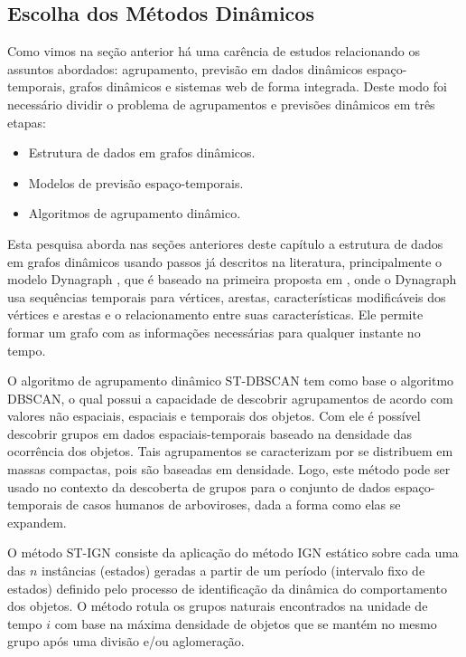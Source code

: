 \subsection{Escolha dos Métodos Dinâmicos}
\label{subsec:metodos-escolhidos}

Como vimos na seção anterior há uma carência de estudos relacionando os assuntos abordados: agrupamento, previsão em dados dinâmicos espaço-temporais, grafos dinâmicos e sistemas web de forma integrada. Deste modo foi necessário dividir o problema de agrupamentos e previsões dinâmicos em três etapas:
\begin{itemize}
\item Estrutura de dados em grafos dinâmicos.
\item Modelos de previsão espaço-temporais.
\item Algoritmos de agrupamento dinâmico.
\end{itemize}

Esta pesquisa aborda nas seções anteriores deste capítulo a estrutura de dados em grafos dinâmicos usando passos já descritos na literatura, principalmente o modelo Dynagraph \cite{dynagraph}, que é baseado na primeira proposta em \cite{dynagraph2012}, onde o Dynagraph usa sequências temporais para vértices, arestas, características modificáveis dos vértices e arestas e o relacionamento entre suas características. Ele permite formar um grafo com as informações necessárias para qualquer instante no tempo. 

O algoritmo de agrupamento dinâmico \acrshort{ST-DBSCAN} tem como base o algoritmo \acrshort{DBSCAN}, o qual possui a capacidade de descobrir agrupamentos de acordo com valores não espaciais, espaciais e temporais dos objetos. Com ele é possível descobrir grupos em dados espaciais-temporais baseado na densidade das ocorrência dos objetos. Tais agrupamentos se caracterizam por se distribuem em massas compactas, pois são baseadas em densidade. Logo, este método pode ser usado no contexto da descoberta de grupos para o conjunto de dados espaço-temporais de casos humanos de arboviroses, dada a forma como elas se expandem. 

O método \acrshort{ST-IGN} consiste da aplicação do método \acrshort{IGN} estático \cite{simposioNeg2003} sobre cada uma das $n$ instâncias (estados) geradas a partir de um período (intervalo fixo de estados) definido pelo processo de identificação da dinâmica do comportamento dos objetos. O método rotula os grupos naturais encontrados na unidade de tempo $i$ com base na máxima densidade de objetos que se mantém no mesmo grupo após uma divisão e/ou aglomeração.

